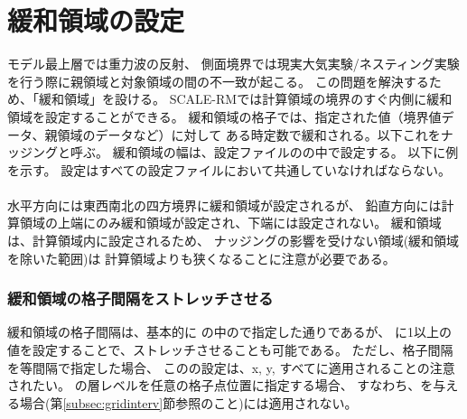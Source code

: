 \section{緩和領域の設定} \label{sec:buffer}
モデル最上層では重力波の反射、
側面境界では現実大気実験/ネスティング実験を行う際に親領域と対象領域の間の不一致が起こる。
この問題を解決するため、「緩和領域」を設ける。
SCALE-RMでは計算領域の境界のすぐ内側に緩和領域を設定することができる。
緩和領域の格子では、指定された値（境界値データ、親領域のデータなど）に対して
ある時定数で緩和される。以下これをナッジングと呼ぶ。
緩和領域の幅は、設定ファイルのの中で設定する。
以下に例を示す。
設定はすべての設定ファイルにおいて共通していなければならない。\\

\\

水平方向には東西南北の四方境界に緩和領域が設定されるが、
鉛直方向には計算領域の上端にのみ緩和領域が設定され、下端には設定されない。
%
緩和領域は、計算領域内に設定されるため、
ナッジングの影響を受けない領域(緩和領域を除いた範囲)は
計算領域よりも狭くなることに注意が必要である。

\subsubsection{緩和領域の格子間隔をストレッチさせる}
緩和領域の格子間隔は、基本的に 
の中ので指定した通りであるが、
に1以上の値を設定することで、ストレッチさせることも可能である。
ただし、格子間隔を等間隔で指定した場合、
このの設定は、x, y, {\ZDIR}すべてに適用されることの注意されたい。
{\ZDIR}の層レベルを任意の格子点位置に指定する場合、
すなわち、を与える場合(第\ref{subsec:gridinterv}節参照のこと)には適用されない。


